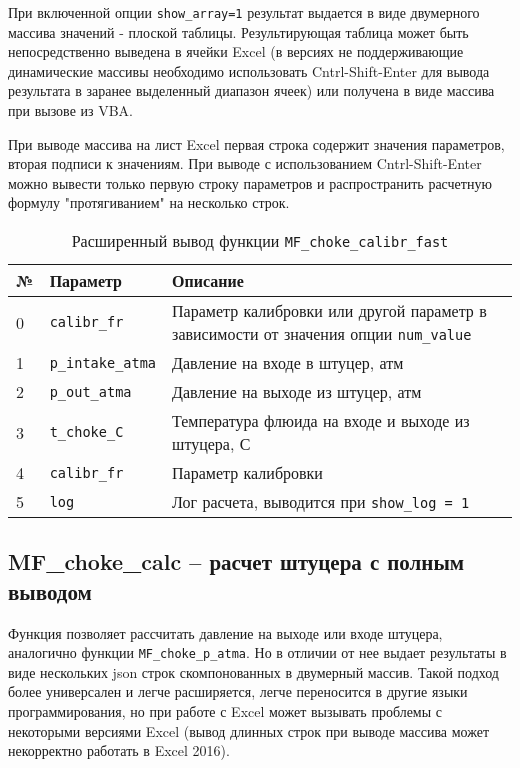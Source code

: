 При включенной опции \texttt{show_array=1} результат выдается в виде двумерного массива значений - плоской таблицы. Результирующая таблица может быть непосредственно выведена в ячейки Excel (в версиях не поддерживающие динамические массивы необходимо использовать Cntrl-Shift-Enter для вывода результата в заранее выделенный диапазон ячеек) или получена в виде массива при вызове из VBA.

При выводе массива на лист Excel первая строка содержит значения параметров, вторая подписи к значениям. При выводе с использованием Cntrl-Shift-Enter можно вывести только первую строку параметров и распространить расчетную формулу "протягиванием" на несколько строк.

\begin{table}[H]
	\caption{Расширенный вывод функции \texttt{MF_choke_calibr_fast}}
	\label{table:param_list_choke_q}
	\begin{tabular}{p{}p{}p{}}
		\hline
		№& Параметр & Описание  \\ \hline
		0 & \texttt{calibr_fr} & Параметр калибровки или другой параметр в зависимости от значения опции 	\texttt{num_value}     \\ \hline
		
		1 & \texttt{p_intake_atma} & Давление на входе в штуцер, атм    \\ \hline
		2 & \texttt{p_out_atma} & Давление на выходе из штуцер, атм    \\ \hline
		3 & \texttt{t_choke_C} & Температура флюида на входе и выходе из штуцера, С  \\ \hline
		
		4 & \texttt{calibr_fr} & Параметр калибровки    \\ \hline
		
		5 & \texttt{log} & Лог расчета, выводится при \texttt{show_log = 1}  \\ \hline
		
	\end{tabular}
\end{table}

\subsection{MF\_choke\_calc – расчет штуцера с полным выводом}
Функция позволяет рассчитать давление на выходе или входе штуцера, аналогично функции \texttt{MF_choke_p_atma}. Но в отличии от нее выдает результаты в виде нескольких json строк скомпонованных в двумерный массив. Такой подход более универсален и легче расширяется, легче переносится в другие языки программирования, но при работе с Excel может вызывать проблемы с некоторыми версиями Excel (вывод длинных строк при выводе массива может некорректно работать в Excel 2016).

